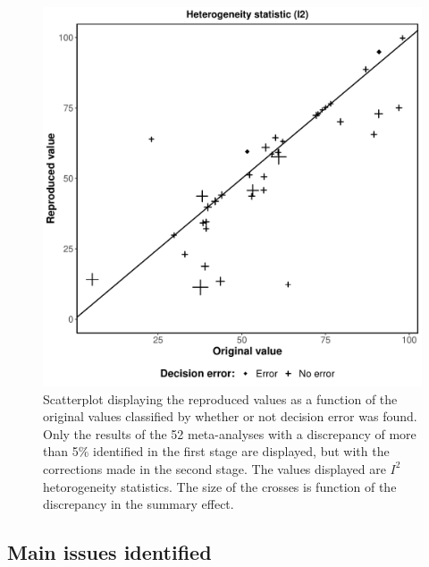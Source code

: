 \documentclass[
  ,apa7,floatsintext]{apa6}
\begin{document}
\begin{figure}
\centering
\includegraphics{manuscript_files/figure-latex/unnamed-chunk-5-1.pdf}
\caption{\label{fig:unnamed-chunk-5}Scatterplot displaying the reproduced values as a function of the original values classified by whether or not decision error was found. Only the results of the 52 meta-analyses with a discrepancy of more than 5\% identified in the first stage are displayed, but with the corrections made in the second stage. The values displayed are \(I^2\) hetorogeneity statistics. The size of the crosses is function of the discrepancy in the summary effect.}
\end{figure}

\hypertarget{main-issues-identified}{%
\subsection{Main issues identified}\label{main-issues-identified}}
\end{document}
